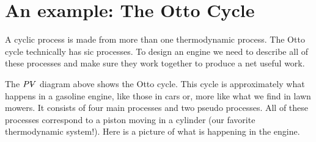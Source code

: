 \documentclass{article}
\begin{document}
\section{An example: The Otto Cycle}

A cyclic process is made from more than one thermodynamic process. The Otto
cycle technically has sic processes. To design an engine we need to describe
all of these processes and make sure they work together to produce a net
useful work.


The $P%
\ooalign{\hfil$V$\hfil\cr\kern0.1em--\hfil\cr}%
\ $diagram above shows the Otto cycle. This cycle is approximately what
happens in a gasoline engine, like those in cars or, more like what we find
in lawn mowers. It consists of four main processes and two pseudo processes.
All of these processes correspond to a piston moving in a cylinder (our
favorite thermodynamic system!). Here is a picture of what is happening in
the engine. 
\end{document}
